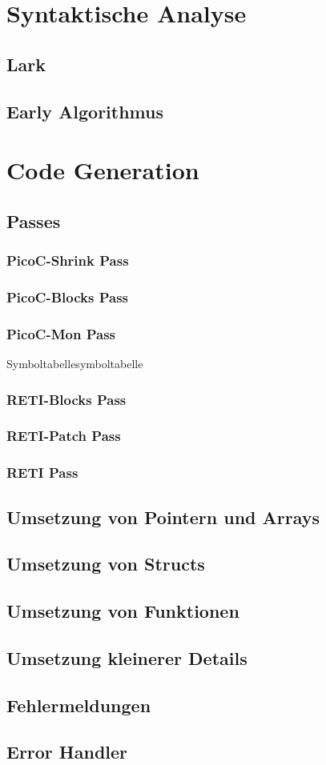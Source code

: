 \section{Syntaktische Analyse}
\subsection{Lark}
\subsection{Early Algorithmus}
\section{Code Generation}
\subsection{Passes}
\subsubsection{PicoC-Shrink Pass}
\subsubsection{PicoC-Blocks Pass}
\subsubsection{PicoC-Mon Pass}
\begin{Definition}{Symboltabelle}{symboltabelle}
\end{Definition}
\subsubsection{RETI-Blocks Pass}
\subsubsection{RETI-Patch Pass}
\subsubsection{RETI Pass}
\subsection{Umsetzung von Pointern und Arrays}
\subsection{Umsetzung von Structs}
\subsection{Umsetzung von Funktionen}
\subsection{Umsetzung kleinerer Details}
\subsection{Fehlermeldungen}
\subsection{Error Handler}
